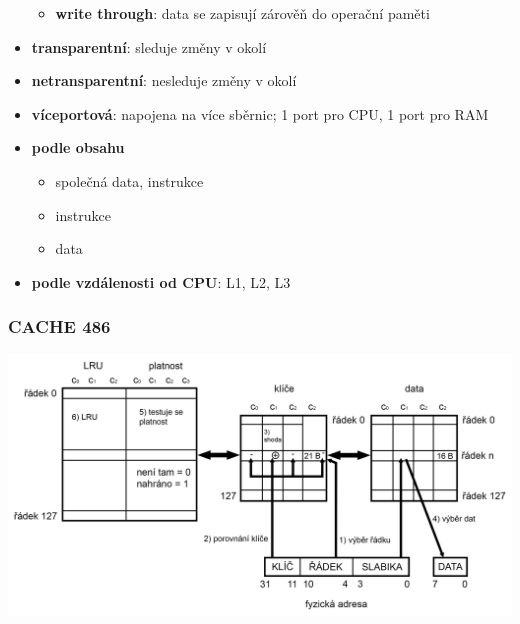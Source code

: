 \documentclass[a4paper,12pt]{article}
\providecommand{\tightlist}{%
\setlength{\itemsep}{0pt}\setlength{\parskip}{0pt}}
\begin{document}
\begin{itemize}
\begin{itemize}
\begin{itemize}
    \end{itemize}
    \item \textbf{write through}: data se zapisují zárověň do operační paměti
  \end{itemize}
  \item \textbf{transparentní}: sleduje změny v okolí
  \item \textbf{netransparentní}: nesleduje změny v okolí
  \item \textbf{víceportová}: napojena na více sběrnic; 1 port pro CPU, 1 port
  pro RAM
  \item \textbf{podle obsahu}
  \begin{itemize}
    \tightlist
    \item společná data, instrukce
    \item instrukce
    \item data
  \end{itemize}
  \item \textbf{podle vzdálenosti od CPU}: L1, L2, L3
\end{itemize}

\subsubsection{CACHE 486}

\includegraphics[width=\textwidth]{ref/cache-486.png}
\end{document}
